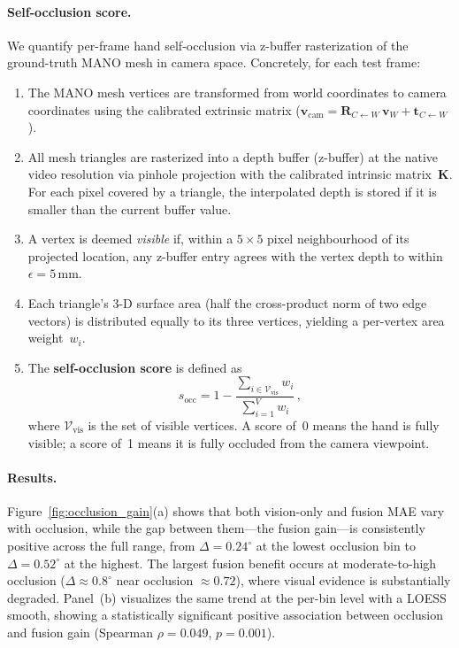 \documentclass{article}
\newcommand{\degree}{^\circ}
\begin{document}
\paragraph{Self-occlusion score.}
We quantify per-frame hand self-occlusion via z-buffer rasterization of the
ground-truth MANO mesh in camera space.  Concretely, for each test frame:
\begin{enumerate}[nosep]
  \item The MANO mesh vertices are transformed from world coordinates to camera
        coordinates using the calibrated extrinsic matrix ($\mathbf{v}_{\text{cam}} =
        \mathbf{R}_{C \leftarrow W}\,\mathbf{v}_W + \mathbf{t}_{C \leftarrow W}$).
  \item All mesh triangles are rasterized into a depth buffer (z-buffer) at the
        native video resolution via pinhole projection with the calibrated
        intrinsic matrix~$\mathbf{K}$.  For each pixel covered by a triangle, the
        interpolated depth is stored if it is smaller than the current buffer value.
  \item A vertex is deemed \emph{visible} if, within a $5 \times 5$ pixel
        neighbourhood of its projected location, any z-buffer entry agrees with
        the vertex depth to within $\epsilon = 5$\,mm.
  \item Each triangle's 3-D surface area (half the cross-product norm of two
        edge vectors) is distributed equally to its three vertices, yielding a
        per-vertex area weight~$w_i$.
  \item The \textbf{self-occlusion score} is defined as
        \begin{equation}
          s_{\text{occ}} = 1 - \frac{\sum_{i \in \mathcal{V}_{\text{vis}}} w_i}
                                     {\sum_{i=1}^{V} w_i}\,,
        \end{equation}
        where $\mathcal{V}_{\text{vis}}$ is the set of visible vertices.
        A score of~0 means the hand is fully visible; a score of~1 means it is
        fully occluded from the camera viewpoint.
\end{enumerate}

\paragraph{Results.}
Figure~\ref{fig:occlusion_gain}(a) shows that both vision-only and fusion MAE
vary with occlusion, while the gap between them---the fusion gain---is consistently
positive across the full range, from $\Delta = 0.24\degree$ at the lowest occlusion
bin to $\Delta = 0.52\degree$ at the highest.
The largest fusion benefit occurs at moderate-to-high occlusion
($\Delta \approx 0.8\degree$ near occlusion $\approx 0.72$), where visual evidence
is substantially degraded.
Panel~(b) visualizes the same trend at the per-bin level with a LOESS smooth,
showing a statistically significant positive association between occlusion and
fusion gain (Spearman $\rho = 0.049$, $p = 0.001$).

\FloatBarrier
\newpage

\end{document}
